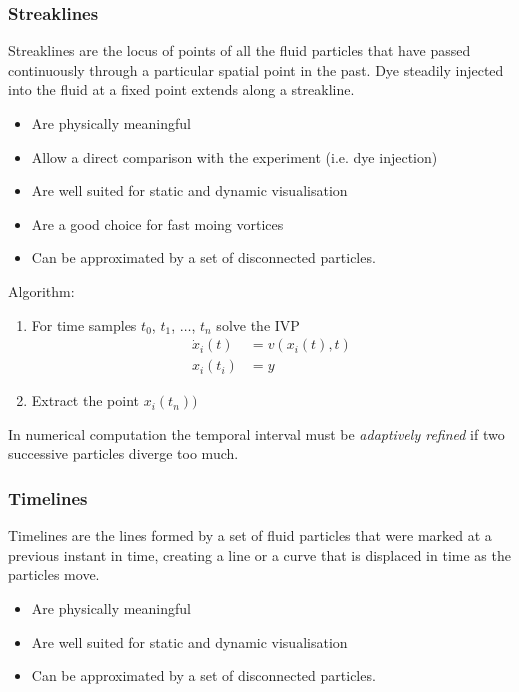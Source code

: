 \subsubsection{Streaklines}
Streaklines are the locus of points of all the fluid particles that have passed continuously through a particular spatial point in the past. Dye steadily injected into the fluid at a fixed point extends along a streakline.

\begin{itemize}
    \item Are physically meaningful
    \item Allow a direct comparison with the experiment (i.e. dye injection)
    \item Are well suited for static and dynamic visualisation
    \item Are a good choice for fast moing vortices
    \item Can be approximated by a set of disconnected particles.
\end{itemize}


Algorithm:
\begin{enumerate}
    \item For time samples $t_0$, $t_1$, $\ldots$, $t_n$ solve the IVP
        \begin{align*}
            \dot x_i (t) &= v(x_i(t), t)\\
             x_i(t_i) &= y
        \end{align*}
    \item Extract the point $x_i(t_n))$
\end{enumerate}

In numerical computation the temporal interval must be \emph{adaptively refined} if two successive particles diverge too much.

\subsubsection{Timelines}
Timelines are the lines formed by a set of fluid particles that were marked at a previous instant in time, creating a line or a curve that is displaced in time as the particles move.


\begin{itemize}
    \item Are physically meaningful
    \item Are well suited for static and dynamic visualisation
    \item Can be approximated by a set of disconnected particles.
\end{itemize}



